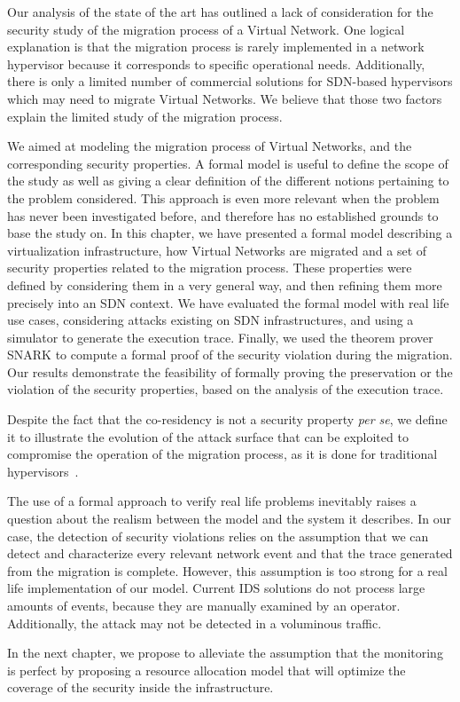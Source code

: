 Our analysis of the state of the art has outlined a lack of consideration for the security study of the migration process of a Virtual Network.
One logical explanation is that the migration process is rarely implemented in a network hypervisor because it corresponds to specific operational needs. Additionally, there is only a limited number of commercial solutions for SDN-based hypervisors which may need to migrate Virtual Networks. We believe that those two factors explain the limited study of the migration process.


We aimed at modeling the migration process of Virtual Networks, and the corresponding security properties.
A formal model is useful to define the scope of the study as well as giving a clear definition of the different notions pertaining to the problem considered.
This approach is even more relevant when the problem has never been investigated before, and therefore has no established grounds to base the study on.
In this chapter, we have presented a formal model describing a virtualization infrastructure, how Virtual Networks are migrated  and a set of security properties related to the migration process. These properties were defined by considering them in a very general way, and then refining them more precisely into an SDN context. We have evaluated the formal model with real life use cases, considering attacks existing on SDN infrastructures, and using a simulator to generate the execution trace. Finally, we used the theorem prover SNARK to compute a formal proof of the security violation during the migration. Our results demonstrate the feasibility of formally proving the preservation or the violation of the security properties, based on the analysis of the execution trace.

Despite the fact that the co-residency is not a security property \textit{per se}, we define it to illustrate the evolution of the attack surface that can be exploited to compromise the operation of the migration process, as it is done for traditional hypervisors~\cite{stalling-atya2017,malicious-atya2017}.

The use of a formal approach to verify real life problems inevitably raises a question about the realism between the model and the system it describes.
In our case, the detection of security violations relies on the assumption that we can detect and characterize every relevant network event and that the trace generated from the migration is complete. However, this assumption is too strong for a real life implementation of our model. Current IDS solutions do not process large amounts of events, because they are manually examined by an operator.
Additionally, the attack may not be detected in a voluminous traffic.

In the next chapter, we propose to alleviate the assumption that the monitoring is perfect by proposing a resource allocation model that will optimize the coverage of the security inside the infrastructure.